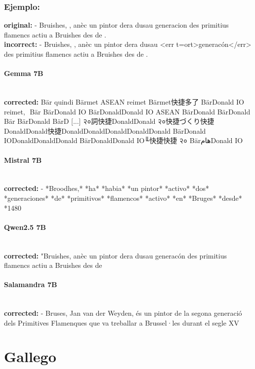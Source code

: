 \subsubsection{Ejemplo:}
\textbf{original:} - Bruishes, , anèc un pintor dera dusau generacion des primitius flamencs actiu a Bruishes des de .\\
\textbf{incorrect:} - Bruishes, , anèc un pintor dera dusau {\textless}err t=ort{\textgreater}generacón{\textless}/err{\textgreater} des primitius flamencs actiu a Bruishes des de .

\paragraph{Gemma 7B}~\\
\textbf{corrected:} Bär quindi Bärmet ASEAN reimet Bärmet快捷多了 BärDonald IO reimet,\,\ Bär BärDonald IO BärDonaldDonald IO ASEAN BärDonald BärDonald Bär BärDonald BärD [...]  २०詞快捷DonaldDonald २०快捷づくり快捷DonaldDonald快捷DonaldDonaldDonaldDonaldDonald BärDonald IODonaldDonaldDonald BärDonaldDonald IO╙快捷快捷 २० BärهامDonald IO

\paragraph{Mistral 7B}~\\
\textbf{corrected:} - *Broodhes,* *ha* *habia* *un pintor* *activo* *dos* *generaciones* *de* *primitivos* *flamencos* *activo* *en* *Bruges* *desde* *1480

\paragraph{Qwen2.5 7B}~\\
\textbf{corrected:} "Bruishes, anèc un pintor dera dusau generacón des primitius flamencs actiu a Bruishes des de

\paragraph{Salamandra 7B}~\\
\textbf{corrected:} - Bruses, Jan van der Weyden, és un pintor de la segona generació dels Primitives Flamenques que va treballar a Brussel·les durant el segle XV

\vspace{1em}

\section{Gallego}

